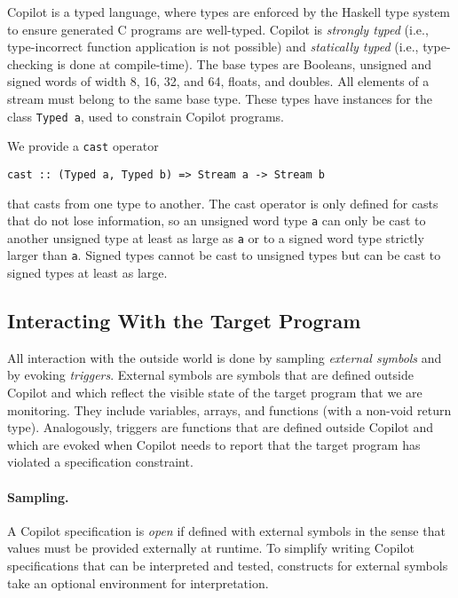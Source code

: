 Copilot is a typed language, where types are enforced by the Haskell type system
to ensure generated C programs are well-typed.  Copilot is \emph{strongly typed}
(i.e., type-incorrect function application is not possible) and \emph{statically
  typed} (i.e., type-checking is done at compile-time).  The base types are
Booleans, unsigned and signed words of width 8, 16, 32, and 64, floats, and
doubles.  All elements of a stream must belong to the same base
type.  These types have instances for the class {\tt Typed a}, used to constrain
Copilot programs.

We provide a {\tt cast} operator
%
\begin{lstlisting}
cast :: (Typed a, Typed b) => Stream a -> Stream b  
\end{lstlisting}
%
that casts from one type to another.  The cast operator is only defined for
casts that do not lose information, so an unsigned word type {\tt a} can only be cast to another unsigned  type at least as large as {\tt a} or to a signed word type
strictly larger than {\tt a}.  Signed types cannot be cast to unsigned types but
can be cast to signed types at least as large.

\subsection{Interacting With the Target Program}
\label{sec:interacting}

All interaction with the outside world is done by sampling \emph{external
  symbols} and by evoking \emph{triggers}.  External symbols are symbols that
are defined outside Copilot and which reflect the visible state of the target
program that we are monitoring.  They include variables, arrays, and functions
(with a non-void return type).  Analogously, triggers are functions that are
defined outside Copilot and which are evoked when Copilot needs to report that
the target program has violated a specification constraint.

\paragraph{Sampling.}
A Copilot specification is \emph{open} if defined with external symbols in the
sense that values must be provided externally at runtime.  To simplify writing
Copilot specifications that can be interpreted and tested, constructs for
external symbols take an optional environment for interpretation.

